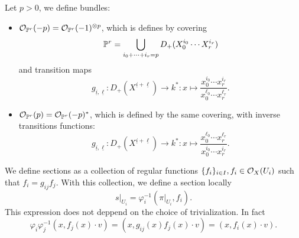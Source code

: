\begin{dang}
    \begin{definition}
        Let $p>0$, we define bundles:
        \begin{itemize}
            \item[(1)] $\mathcal{O}_{\mathbb{P}^r}(-p)=\mathcal{O}_{\mathbb{P}^r}(-1)^{\otimes p}$, which is defines by covering 
            \begin{equation}
                \mathbb{P}^r= \bigcup_{i_0+\cdots+i_r=p}D_+(X_0^{i_0}\cdots X_r^{i_r})
            \end{equation}
            and transition maps 
            \begin{equation}
                g_{\underline{i},\underline{\ell}}:D_+(X^{\underline{i}+\underline{\ell}})\to k^*:
                x\mapsto \frac{x_0^{i_0}\cdots x_r^{i_r}}{x_0^{\ell_0}\cdots x_r^{\ell_r}}.
            \end{equation}
            \item[(2)]$\mathcal{O}_{\mathbb{P}^r}(p) = \mathcal{O}_{\mathbb{P}^r}(-p)^*$, which is defined by the same covering, with inverse 
            transitions functions:
            \begin{equation}
                g_{\underline{i},\underline{\ell}}:D_+(X^{\underline{i}+\underline{\ell}})\to k^*:
                x\mapsto \frac{x_0^{\ell_0}\cdots x_r^{\ell_r}}{x_0^{i_0}\cdots x_r^{i_r}}.
            \end{equation}
        \end{itemize}
    \end{definition}
\end{dang}

We define sections as a collection of regular functions $\{f_i\}_{i\in I}, f_i\in\mathcal{O}_X(U_i)$
such that $f_i = g_{ij}f_j$. With this collection, we define a section locally
\begin{equation}
    s|_{U_i} = \varphi_i^{-1}(\pi|_{U_i},f_i).
\end{equation}
This expression does not deppend on the choice of trivialization. In fact 
\begin{equation}
    \varphi_i\varphi_j^{-1}(x,f_j(x)\cdot v) = (x, g_{ij}(x)f_j(x)\cdot v) = (x,f_i(x)\cdot v).
\end{equation}

